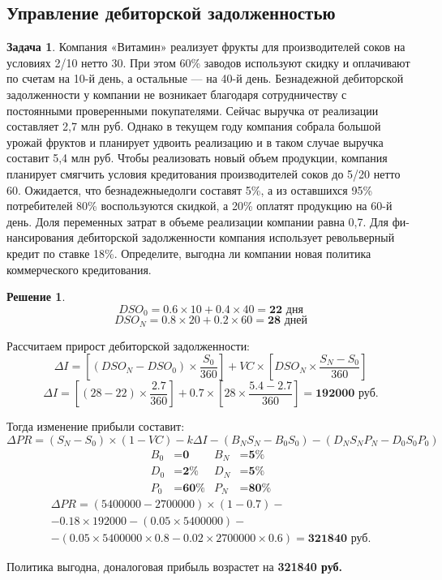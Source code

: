 \documentclass[a4paper, 14pt]{article}
\theoremstyle{plain} %
\theoremstyle{definition} %
\newtheorem*{solution}{Решение}
\newtheorem{problem}{Задача}[subsection]
\theoremstyle{remark} %
\begin{document}
\subsection{Управление дебиторской задолженностью}

\begin{problem}
	Компания  «Витамин»  реализует  фрукты  для производителей соков на условиях 2/10 нетто 30. При этом 60\% заводов используют скидку и оплачивают по счетам на 10-й день, а остальные --- на  40-й  день.  Безнадежной  дебиторской задолженности у компании не возникает благодаря сотрудничеству с постоянными проверенными покупателями. Сейчас выручка от реализации  составляет  2,7  млн  руб.  Однако  в  текущем  году компания собрала большой урожай фруктов и планирует удвоить реализацию и в таком случае выручка составит 5,4 млн руб. Чтобы реализовать  новый  объем  продукции,  компания  планирует смягчить условия кредитования производителей соков до 5/20 нетто 60.  Ожидается,  что  безнадежныедолги  составят  5\%,  а  из оставшихся 95\% потребителей 80\% воспользуются скидкой, а 20\% оплатят продукцию на 60-й день. Доля переменных затрат в объеме реализации компании равна 0,7. Для фи-нансирования дебиторской задолженности компания использует револьверный кредит по ставке  18\%.  Определите,  выгодна  ли  компании  новая  политика  коммерческого кредитования.
	\begin{solution}
		\[DSO_{0} = 0.6 \times 10 + 0.4 \times 40 = \textbf{22 дня}\]
		\[DSO_{N} = 0.8 \times 20 + 0.2 \times 60 = \textbf{28 дней}\]

		Рассчитаем прирост дебиторской задолженности:
		\[\Delta I = \left[(DSO_{N}-DSO_{0})\times \frac{S_{0}}{360}\right]+VC\times \left[DSO_{N}\times \frac{S_{N}-S_{0}}{360}\right]\]
		\[\Delta I = \left[(28-22)\times \frac{2.7}{360}\right]+0.7\times \left[28\times \frac{5.4-2.7}{360}\right] = \textbf{192000 руб.}\]

		Тогда изменение прибыли составит:
		\[\Delta PR = (S_{N} - S_{0})\times(1-VC) - k\Delta I - (B_{N}S_{N} - B_{0}S_{0}) - (D_{N}S_{N}P_{N} - D_{0}S_{0}P_{0})\]
		\begin{align*}
			B_{0} &= \textbf{0} & B_{N} &= \textbf{5\%} \\
			D_{0} &= \textbf{2\%} & D_{N} &= \textbf{5\%} \\
			P_{0} &= \textbf{60\%} & P_{N} &= \textbf{80\%}
		\end{align*}
		\begin{multline*}
			\Delta PR = (5400000 - 2700000)\times(1-0.7) - \\ - 0.18\times 192000 - (0.05 \times 5400000) - \\
			- (0.05 \times 5400000 \times 0.8 - 0.02 \times 2700000 \times 0.6) = \textbf{321840 руб.}
		\end{multline*}

		Политика выгодна, доналоговая прибыль возрастет на \textbf{321840 руб.}
	\end{solution}
\end{problem}
\end{document}

